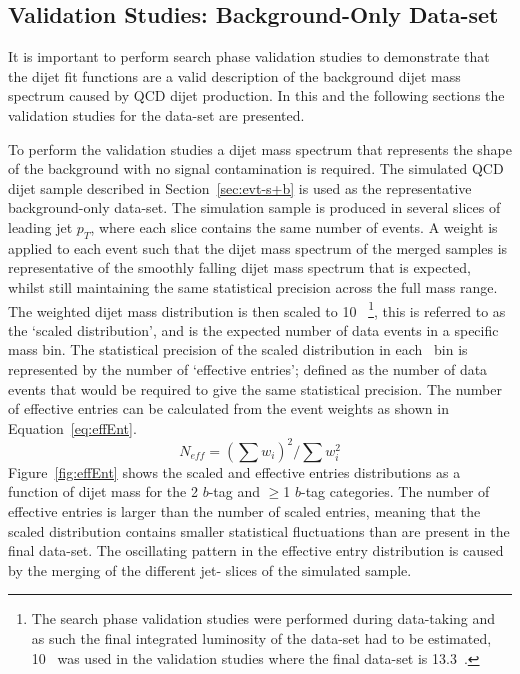 \subsection{Validation Studies: Background-Only Data-set}
\label{sec:bkg-summer_fitCR}

It is important to perform search phase validation studies to demonstrate
that the dijet fit functions are a valid description of the background dijet mass spectrum caused by QCD dijet production.
In this and the following sections the validation studies for the \summer{} data-set are presented.

To perform the validation studies a dijet mass spectrum that represents the shape of the background with no signal contamination is required.
The simulated QCD dijet sample described in Section~\ref{sec:evt-s+b} is used as the representative background-only data-set.
The simulation sample is produced in several slices of leading jet $p_{T}$, where each slice contains the same number of events.
A weight is applied to each event such that the dijet mass spectrum of the merged samples is representative of the smoothly falling dijet mass spectrum that is expected,
whilst still maintaining the same statistical precision across the full mass range.
The weighted dijet mass distribution is then scaled to 10~\ifb{}
\footnote{
  The search phase validation studies were performed during data-taking
  and as such the final integrated luminosity of the data-set had to be estimated,
  10~\ifb{} was used in the validation studies where the final data-set is 13.3~\ifb{}.
},
this is referred to as the  `scaled distribution', and is the expected number of data events in a specific mass bin. 
The statistical precision of the scaled distribution in each \mjj{}~bin is represented by the number of `effective entries';
defined as the number of data events that would be required to give the same statistical precision.
 The number of effective entries can be calculated from the event weights as shown in Equation~\ref{eq:effEnt}.
\begin{equation}
  N_{eff} = (\sum{w_i})^2 / \sum{w_i^2}
  \label{eq:effEnt}
\end{equation}
Figure~\ref{fig:effEnt} shows the scaled and effective entries distributions as a function of dijet mass for the 2 $b$-tag and $\geq$1 $b$-tag categories.
The number of effective entries is larger than the number of scaled entries,
meaning that the scaled distribution contains smaller statistical fluctuations than are present in the final data-set.
The oscillating pattern in the effective entry distribution is caused by the merging of the different jet-\pT{} slices of the simulated sample. 

